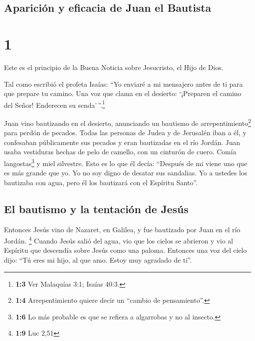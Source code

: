 \hypertarget{apariciuxf3n-y-eficacia-de-juan-el-bautista}{%
\subsection{Aparición y eficacia de Juan el
Bautista}\label{apariciuxf3n-y-eficacia-de-juan-el-bautista}}

\hypertarget{section}{%
\section{1}\label{section}}

 Este es el principio de la Buena Noticia sobre
Jesucristo, el Hijo de Dios.

 Tal como escribió el profeta Isaías: ``Yo enviaré a mi
mensajero antes de ti para que prepare tu camino.  Una voz
que clama en el desierto: `¡Preparen el camino del Señor! Enderecen su
senda'\,''.\footnote{\textbf{1:3} Ver Malaquías 3:1; Isaías 40:3.}

 Juan vino bautizando en el desierto, anunciando un
bautismo de arrepentimiento\footnote{\textbf{1:4} Arrepentimiento quiere
  decir un ``cambio de pensamiento''.} para perdón de pecados.
 Todas las personas de Judea y de Jerusalén iban a él, y
confesaban públicamente sus pecados y eran bautizadas en el río Jordán.
 Juan usaba vestiduras hechas de pelo de camello, con un
cinturón de cuero. Comía langostas\footnote{\textbf{1:6} Lo más probable
  es que se refiera a algarrobas y no al insecto.} y miel silvestre.
 Esto es lo que él decía: ``Después de mi viene uno que es
más grande que yo. Yo no soy digno de desatar sus sandalias.
 Yo a ustedes los bautizaba con agua, pero él los
bautizará con el Espíritu Santo''.

\hypertarget{el-bautismo-y-la-tentaciuxf3n-de-jesuxfas}{%
\subsection{El bautismo y la tentación de
Jesús}\label{el-bautismo-y-la-tentaciuxf3n-de-jesuxfas}}

 Entonces Jesús vino de Nazaret, en Galilea, y fue
bautizado por Juan en el río Jordán. \footnote{\textbf{1:9} Luc 2,51}
 Cuando Jesús salió del agua, vio que los cielos se
abrieron y vio al Espíritu que descendía sobre Jesús como una paloma.
 Entonces una voz del cielo dijo: ``Tú eres mi hijo, al
que amo. Estoy muy agradado de ti''.

